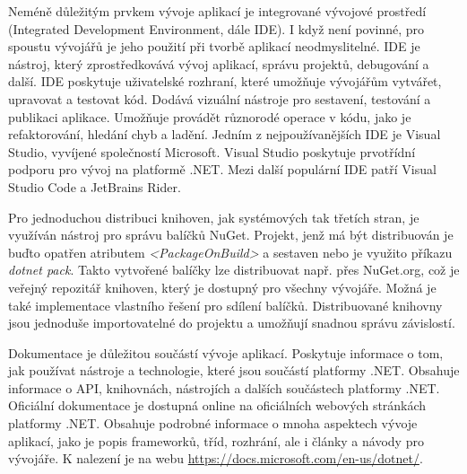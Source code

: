
Neméně důležitým prvkem vývoje aplikací je integrované vývojové prostředí (Integrated Development Environment, dále IDE). I když není povinné, pro spoustu vývojářů je jeho použití při tvorbě aplikací neodmyslitelné. IDE je nástroj, který zprostředkovává vývoj aplikací, správu projektů, debugování a další. IDE poskytuje uživatelské rozhraní, které umožňuje vývojářům vytvářet, upravovat a testovat kód. Dodává vizuální nástroje pro sestavení, testování a publikaci aplikace. Umožňuje provádět různorodé operace v kódu, jako je refaktorování, hledání chyb a ladění. Jedním z nejpoužívanějších IDE je Visual Studio, vyvíjené společností Microsoft. Visual Studio poskytuje prvotřídní podporu pro vývoj na platformě .NET. Mezi další populární IDE patří Visual Studio Code a JetBrains Rider.


Pro jednoduchou distribuci knihoven, jak systémových tak třetích stran, je využíván nástroj pro správu balíčků NuGet. Projekt, jenž má být distribuován je buďto opatřen atributem \emph{<PackageOnBuild>} a sestaven nebo je využito příkazu \emph{dotnet pack}. Takto vytvořené balíčky lze distribuovat např. přes NuGet.org, což je veřejný repozitář knihoven, který je dostupný pro všechny vývojáře. Možná je také implementace vlastního řešení pro sdílení balíčků. Distribuované knihovny jsou jednoduše importovatelné do projektu a umožňují snadnou správu závislostí.


Dokumentace je důležitou součástí vývoje aplikací. Poskytuje informace o tom, jak používat nástroje a technologie, které jsou součástí platformy .NET. Obsahuje informace o API, knihovnách, nástrojích a dalších součástech platformy .NET. Oficiální dokumentace je dostupná online na oficiálních webových stránkách platformy .NET. Obsahuje podrobné informace o mnoha aspektech vývoje aplikací, jako je popis frameworků, tříd, rozhrání, ale i články a návody pro vývojáře. K nalezení je na webu \url{https://docs.microsoft.com/en-us/dotnet/}.


